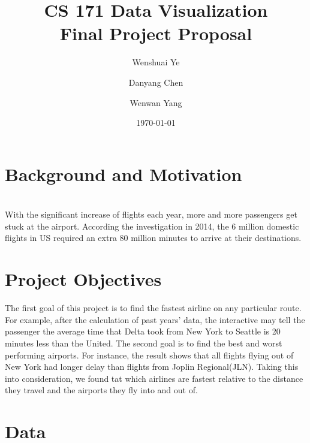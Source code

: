 \documentclass[11pt]{article}
\author[1]{Wenshuai Ye}
\author[1]{Danyang Chen}
\author[1]{Wenwan Yang}
\affil[1]{Department of Computational Science and Engineering}
\theoremstyle{definition}
\begin{document}

\title{\textbf{CS 171 Data Visualization}\\ \textbf{Final Project Proposal}}

\pretitle{\begin{centering}\Large}
\posttitle{\par\end{centering}}

\date{\today}
\vspace{-10em}
\maketitle
\vspace{-2em}


\section{\textbf{Background and Motivation}}
\\With the significant increase of flights each year, more and more passengers get stuck at the airport. According the investigation in 2014, the 6 million domestic flights in US required an extra 80 million minutes to arrive at their destinations.

\section{\textbf{Project Objectives}}
The first goal of this project is to find the fastest airline on any particular route. For example, after the calculation of past years' data, the interactive may tell the passenger the average time that Delta took from New York to Seattle is 20 minutes less than the United. The second goal is to find the best and worst performing airports. For instance, the result shows that all flights flying out of New York had longer delay than flights from Joplin Regional(JLN). Taking this into consideration, we found tat which airlines are fastest relative to the distance they travel and the airports they fly into and out of. 


\section{\textbf{Data}}
\end{document}
